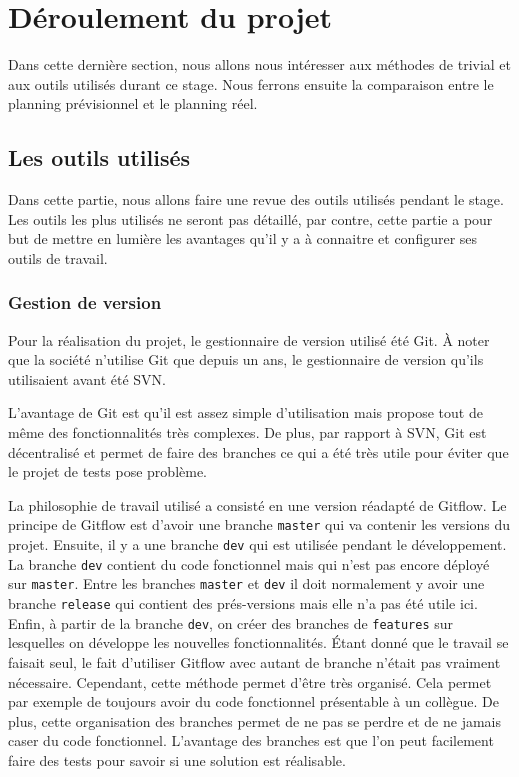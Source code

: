 \documentclass[a4paper]{article}
\begin{document}
\section{Déroulement du projet}%

Dans cette dernière section, nous allons nous intéresser aux méthodes de
trivial et aux outils utilisés durant ce stage. Nous ferrons ensuite la
comparaison entre le planning prévisionnel et le planning réel.

\subsection{Les outils utilisés}%

Dans cette partie, nous allons faire une revue des outils utilisés pendant le
stage. Les outils les plus utilisés ne seront pas détaillé, par contre, cette
partie a pour but de mettre en lumière les avantages qu'il y a à connaitre et
configurer ses outils de travail.

\subsubsection{Gestion de version}%

Pour la réalisation du projet, le gestionnaire de version utilisé été Git. À
noter que la société n'utilise Git que depuis un ans, le gestionnaire de version
qu'ils utilisaient avant été SVN.

L'avantage de Git est qu'il est assez simple d'utilisation mais propose tout de
même des fonctionnalités très complexes. De plus, par rapport à SVN, Git est
décentralisé et permet de faire des branches ce qui a été très utile pour éviter
que le projet de tests pose problème.

La philosophie de travail utilisé a consisté en une version réadapté de Gitflow.
Le principe de Gitflow est d'avoir une branche \verb|master| qui va
contenir les versions du projet. Ensuite, il y a une branche \verb|dev| qui
est utilisée pendant le développement. La branche \verb|dev| contient du
code fonctionnel mais qui n'est pas encore déployé sur \verb|master|. Entre
les branches \verb|master| et \verb|dev| il doit normalement y avoir
une branche \verb|release| qui contient des prés-versions mais elle n'a pas
été utile ici. Enfin, à partir de la branche \verb|dev|, on créer des
branches de \verb|features| sur lesquelles on développe les nouvelles
fonctionnalités. Étant donné que le travail se faisait seul, le fait d'utiliser
Gitflow avec autant de branche n'était pas vraiment nécessaire. Cependant, cette
méthode permet d'être très organisé. Cela permet par exemple de toujours avoir
du code fonctionnel présentable à un collègue. De plus, cette organisation des
branches permet de ne pas se perdre et de ne jamais caser du code fonctionnel.
L'avantage des branches est que l'on peut facilement faire des tests pour savoir
si une solution est réalisable.
\end{document}
